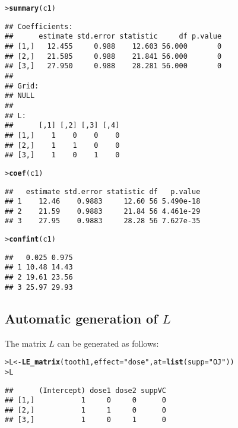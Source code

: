 \documentclass[11pt]{article}\usepackage[]{graphicx}\usepackage[]{color}
\makeatletter
\newcommand{\hlstr}[1]{\textcolor[rgb]{0.192,0.494,0.8}{#1}}%
\newcommand{\hlstd}[1]{\textcolor[rgb]{0.345,0.345,0.345}{#1}}%
\newcommand{\hlkwb}[1]{\textcolor[rgb]{0.69,0.353,0.396}{#1}}%
\newcommand{\hlkwc}[1]{\textcolor[rgb]{0.333,0.667,0.333}{#1}}%
\newcommand{\hlkwd}[1]{\textcolor[rgb]{0.737,0.353,0.396}{\textbf{#1}}}%
\newenvironment{kframe}{%
 \def\at@end@of@kframe{}%
 \ifinner\ifhmode%
  \def\at@end@of@kframe{\end{minipage}}%
  \begin{minipage}{\columnwidth}%
 \fi\fi%
 \def\FrameCommand##1{\hskip\@totalleftmargin \hskip-\fboxsep
 \colorbox{shadecolor}{##1}\hskip-\fboxsep
     \hskip-\linewidth \hskip-\@totalleftmargin \hskip\columnwidth}%
 \MakeFramed {\advance\hsize-\width
   \@totalleftmargin\z@ \linewidth\hsize
   \@setminipage}}%
 {\par\unskip\endMakeFramed%
 \at@end@of@kframe}
\newenvironment{knitrout}{}{} %
\renewenvironment{knitrout}{
  \begin{oldknitrout}
    \footnotesize
    \topsep=0pt
}{
  \end{oldknitrout}
}
\makeatother
\begin{document}
\begin{knitrout}
\color{fgcolor}\begin{kframe}
\begin{alltt}
\hlstd{> }\hlkwd{summary}\hlstd{(c1)}
\end{alltt}
\begin{verbatim}
## Coefficients:
##      estimate std.error statistic     df p.value
## [1,]   12.455     0.988    12.603 56.000       0
## [2,]   21.585     0.988    21.841 56.000       0
## [3,]   27.950     0.988    28.281 56.000       0
## 
## Grid:
## NULL
## 
## L:
##      [,1] [,2] [,3] [,4]
## [1,]    1    0    0    0
## [2,]    1    1    0    0
## [3,]    1    0    1    0
\end{verbatim}
\begin{alltt}
\hlstd{> }\hlkwd{coef}\hlstd{(c1)}
\end{alltt}
\begin{verbatim}
##   estimate std.error statistic df   p.value
## 1    12.46    0.9883     12.60 56 5.490e-18
## 2    21.59    0.9883     21.84 56 4.461e-29
## 3    27.95    0.9883     28.28 56 7.627e-35
\end{verbatim}
\begin{alltt}
\hlstd{> }\hlkwd{confint}\hlstd{(c1)}
\end{alltt}
\begin{verbatim}
##   0.025 0.975
## 1 10.48 14.43
## 2 19.61 23.56
## 3 25.97 29.93
\end{verbatim}
\end{kframe}
\end{knitrout}

\subsection{Automatic generation of $L$}
\label{sec:autom-gener-l}


The matrix $L$ can be generated as follows:
\begin{knitrout}
\color{fgcolor}\begin{kframe}
\begin{alltt}
\hlstd{> }\hlstd{L} \hlkwb{<-} \hlkwd{LE_matrix}\hlstd{(tooth1,} \hlkwc{effect}\hlstd{=}\hlstr{"dose"}\hlstd{,} \hlkwc{at}\hlstd{=}\hlkwd{list}\hlstd{(}\hlkwc{supp}\hlstd{=}\hlstr{"OJ"}\hlstd{))}
\hlstd{> }\hlstd{L}
\end{alltt}
\begin{verbatim}
##      (Intercept) dose1 dose2 suppVC
## [1,]           1     0     0      0
## [2,]           1     1     0      0
## [3,]           1     0     1      0
\end{verbatim}
\end{kframe}
\end{knitrout}
\end{document}
